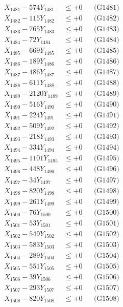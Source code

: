 \documentclass[a4paper,10pt]{article}
\begin{document}
{\begin{align}
\allowbreak
X_{1481} - 574Y_{1481} &\leq +0 && \text{(G1481)} \\
X_{1482} - 115Y_{1482} &\leq +0 && \text{(G1482)} \\
X_{1483} - 765Y_{1483} &\leq +0 && \text{(G1483)} \\
X_{1484} - 72Y_{1484} &\leq +0 && \text{(G1484)} \\
X_{1485} - 669Y_{1485} &\leq +0 && \text{(G1485)} \\
X_{1486} - 189Y_{1486} &\leq +0 && \text{(G1486)} \\
X_{1487} - 486Y_{1487} &\leq +0 && \text{(G1487)} \\
X_{1488} - 611Y_{1488} &\leq +0 && \text{(G1488)} \\
X_{1489} - 2120Y_{1489} &\leq +0 && \text{(G1489)} \\
X_{1490} - 516Y_{1490} &\leq +0 && \text{(G1490)} \\
\allowbreak
X_{1491} - 224Y_{1491} &\leq +0 && \text{(G1491)} \\
X_{1492} - 509Y_{1492} &\leq +0 && \text{(G1492)} \\
X_{1493} - 218Y_{1493} &\leq +0 && \text{(G1493)} \\
X_{1494} - 334Y_{1494} &\leq +0 && \text{(G1494)} \\
X_{1495} - 1101Y_{1495} &\leq +0 && \text{(G1495)} \\
X_{1496} - 448Y_{1496} &\leq +0 && \text{(G1496)} \\
X_{1497} - 34Y_{1497} &\leq +0 && \text{(G1497)} \\
X_{1498} - 820Y_{1498} &\leq +0 && \text{(G1498)} \\
X_{1499} - 261Y_{1499} &\leq +0 && \text{(G1499)} \\
X_{1500} - 76Y_{1500} &\leq +0 && \text{(G1500)} \\
\allowbreak
X_{1501} - 53Y_{1501} &\leq +0 && \text{(G1501)} \\
X_{1502} - 549Y_{1502} &\leq +0 && \text{(G1502)} \\
X_{1503} - 583Y_{1503} &\leq +0 && \text{(G1503)} \\
X_{1504} - 289Y_{1504} &\leq +0 && \text{(G1504)} \\
X_{1505} - 551Y_{1505} &\leq +0 && \text{(G1505)} \\
X_{1506} - 39Y_{1506} &\leq +0 && \text{(G1506)} \\
X_{1507} - 293Y_{1507} &\leq +0 && \text{(G1507)} \\
X_{1508} - 820Y_{1508} &\leq +0 && \text{(G1508)} \\

\end{align}}
\end{document}
